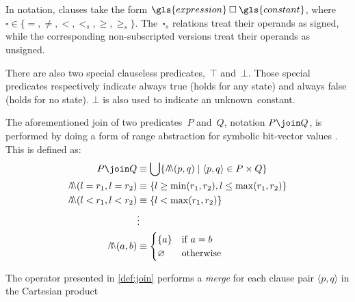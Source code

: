 In notation, clauses
take the form $\gls{expression} \mathbin{\square} \gls{constant}$,%
%
where $\square\in\{=,\neq,<,<_s,\ge,\ge_s\}$.
The~$\square_s$ relations treat their operands as signed,
while the corresponding non-subscripted versions treat their operands as unsigned.

There are also two special clauseless predicates,~$\top$%
and~$\bot$.
Those special predicates respectively indicate always true (holds for any state) and always false (holds for no state).
$\bot$ is also used to indicate an unknown~\gls{constant}.%
\begin{definition}\label{def:join}
  The aforementioned join
  of two predicates~$P$ and~$Q$,%
  notation $P\join Q$,
  is performed by doing a form of range abstraction for symbolic bit-vector values \autocite{rugina2000symbolic}.
  This is defined as:
  \begin{align*} %
    P\join Q &\equiv \bigcup\{\merge(p,q) \mid \langle p,q\rangle\in P\times Q\} \\
    \merge(l=r_1,l=r_2) &\equiv \{l\ge\min(r_1,r_2),l\le\max(r_1,r_2)\} \\
    \merge(l<r_1,l<r_2) &\equiv \{l<\max(r_1,r_2)\} \\
    &\vdots\\
    \merge(a,b) &\equiv
    \begin{cases}
      \{a\} & \text{if }a=b \\
      \varnothing & \text{otherwise}
    \end{cases}
  \end{align*}
\end{definition}
The operator presented in \cref{def:join}
performs a \emph{merge} for each clause pair
$\langle p,q\rangle$
in the Cartesian product %
